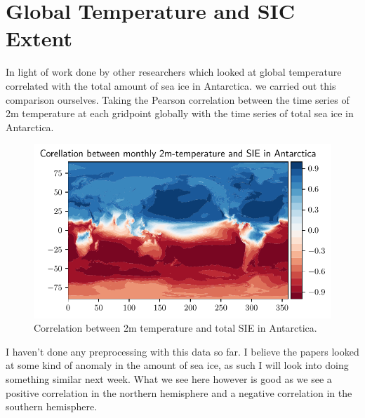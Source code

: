 \section{Global Temperature and SIC Extent}
In light of work done by other researchers which looked at global temperature correlated with the total amount of sea ice in Antarctica. \cite{Wang2019Compounding2016, Meehl2019Sustained2016} we carried out this comparison ourselves. Taking the Pearson correlation between the time series of 2m temperature at each gridpoint globally with the time series of total sea ice in Antarctica.

\begin{figure}[H]
    \centering
    \includegraphics{Images/global_correlation_2mt_sie.pdf}
    \caption{Correlation between 2m temperature and total SIE in Antarctica.}
    \label{fig:my_label}
\end{figure}
I haven't done any preprocessing with this data so far. I believe the papers looked at some kind of anomaly in the amount of sea ice, as such I will look into doing something similar next week.
What we see here however is good as we see a positive correlation in the northern hemisphere and a negative correlation in the southern hemisphere.